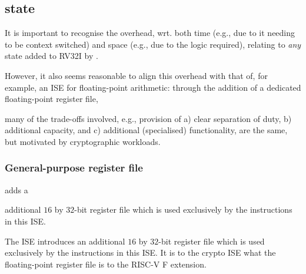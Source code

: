 \subsection{\XCID state}
\label{sec:spec:state}

It is important to recognise the overhead, wrt. both 
time (e.g., due to it needing to be context switched) 
and 
space (e.g., due to the logic required),
relating to {\em any} state added to RV32I by \XCID.

However, it also seems reasonable to align this overhead with that of, for
example, an ISE for floating-point arithmetic: through the addition of a
dedicated floating-point register file, 

many 
of the trade-offs involved, e.g., provision of
a) clear separation of duty,
b) additional capacity,
   and
c) additional (specialised) functionality,
are the same, but motivated by cryptographic workloads.


\subsubsection{General-purpose register file}
\label{sec:spec:state:gpr}

\XCID 
adds a

additional $16$ by $32$-bit register file which
is used exclusively by the instructions in this ISE.

The ISE introduces an additional $16$ by $32$-bit register file which
is used exclusively by the instructions in this ISE.
It is to the crypto ISE what the floating-point register file is to the
RISC-V F extension.


